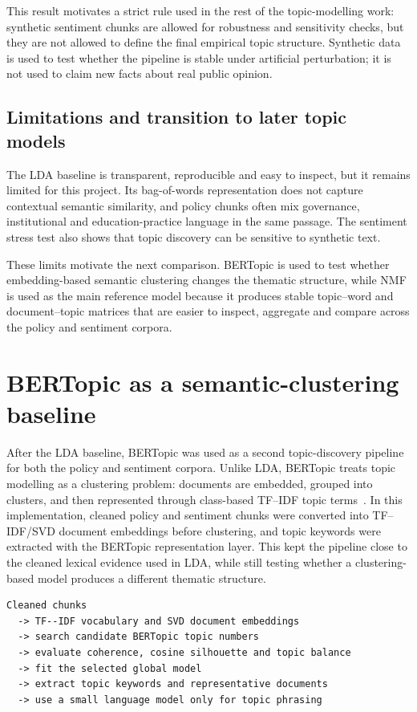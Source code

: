 \documentclass{article}
\begin{document}
This result motivates a strict rule used in the rest of the topic-modelling work:
synthetic sentiment chunks are allowed for robustness and sensitivity checks, but
they are not allowed to define the final empirical topic structure. Synthetic data is
used to test whether the pipeline is stable under artificial perturbation; it is not
used to claim new facts about real public opinion.

\subsection{Limitations and transition to later topic models}

The LDA baseline is transparent, reproducible and easy to inspect, but it remains
limited for this project. Its bag-of-words representation does not capture contextual
semantic similarity, and policy chunks often mix governance, institutional and
education-practice language in the same passage. The sentiment stress test also shows
that topic discovery can be sensitive to synthetic text.

These limits motivate the next comparison. BERTopic is used to test whether
embedding-based semantic clustering changes the thematic structure, while NMF is used
as the main reference model because it produces stable topic--word and
document--topic matrices that are easier to inspect, aggregate and compare across the
policy and sentiment corpora.

\section{BERTopic as a semantic-clustering baseline}

After the LDA baseline, BERTopic was used as a second topic-discovery pipeline for
both the policy and sentiment corpora. Unlike LDA, BERTopic treats topic modelling as
a clustering problem: documents are embedded, grouped into clusters, and then
represented through class-based TF--IDF topic terms~\cite{grootendorst2022bertopic}.
In this implementation, cleaned policy and sentiment chunks were converted into
TF--IDF/SVD document embeddings before clustering, and topic keywords were extracted
with the BERTopic representation layer. This kept the pipeline close to the cleaned
lexical evidence used in LDA, while still testing whether a clustering-based model
produces a different thematic structure.

\begin{verbatim}
Cleaned chunks
  -> TF--IDF vocabulary and SVD document embeddings
  -> search candidate BERTopic topic numbers
  -> evaluate coherence, cosine silhouette and topic balance
  -> fit the selected global model
  -> extract topic keywords and representative documents
  -> use a small language model only for topic phrasing
\end{verbatim}
\end{document}

